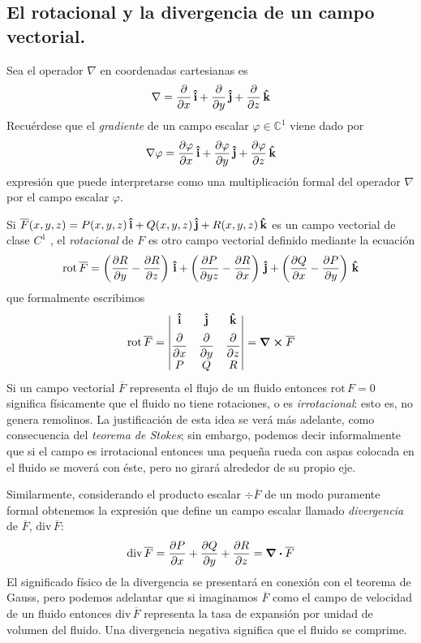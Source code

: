 \documentclass[hidelinks,12pt]{article}
\begin{document}
\subsection{El rotacional y la divergencia de un campo vectorial.}
Sea el operador $\nabla$ en coordenadas cartesianas es
\begin{align*}
\nabla = \pdv{x} \, \vu{i} + \pdv{y} \, \vu{j} + \pdv{z} \, \vu{k} 
\end{align*}
Recuérdese que el \emph{gradiente} de un campo escalar $\varphi \in \mathbb{C}^{1}$ viene dado por
\begin{align*}
\nabla \varphi = \pdv{\varphi}{x} \, \vu{i} + \pdv{\varphi}{y} \, \vu{j} + \pdv{\varphi}{z} \, \vu{k} 
\end{align*}
expresión que puede interpretarse como una multiplicación formal del operador $\nabla$ por el campo escalar $\varphi$.
\par
Si $\overline{F}(x, y, z) = P(x, y, z) \, \vu{i} + Q(x, y, z) \, \vu{j} + R(x, y, z) \, \vu{k}$ es un campo vectorial de clase $C^{1}$ , el \emph{rotacional} de $F$ es otro campo vectorial definido mediante la ecuación
\begin{align*}
\text{rot} \, \overline{F} =  \left( \pdv{R}{y} - \pdv{R}{z} \right) \, \vu{i} + \left( \pdv{P}{yz} - \pdv{R}{x} \right) \, \vu{j} + \left( \pdv{Q}{x} - \pdv{P}{y} \right) \, \vu{k}
\end{align*}
que formalmente escribimos
\begin{align*}
\text{rot} \, \overline{F} = \mdet{
\vu{i} & \vu{j} & \vu{k} \\[0.5em]
\displaystyle \pdv{x} & \displaystyle \pdv{y} & \displaystyle \pdv{z} \\[0.5em]
P & Q & R} = \curl{\overline{F}}
\end{align*}
Si un campo vectorial $\overline{F}$ representa el flujo de un fluido entonces $\text{rot} \, F = 0$ significa físicamente que el fluido no tiene rotaciones, o es \emph{irrotacional}: esto es, no genera remolinos. La justificación de esta idea se verá más adelante, como consecuencia del \emph{teorema de Stokes}; sin embargo, podemos decir informalmente que si el
campo es irrotacional entonces una pequeña rueda con aspas colocada en el fluido se moverá con éste, pero no
girará alrededor de su propio eje.
\par
Similarmente, considerando el producto escalar $\div{\overline{F}}$ de un modo puramente formal obtenemos la expresión que define un campo escalar llamado \emph{divergencia} de $\overline{F}$, $\text{div} \, \overline{F}$:
\begin{align*}
\text{div} \, \overline{F} = \pdv{P}{x} + \pdv{Q}{y} + \pdv{R}{z} = \div{\overline{F}}
\end{align*}
El significado físico de la divergencia se presentará en conexión con el teorema de Gauss, pero podemos adelantar que si imaginamos $\overline{F}$ como el campo de velocidad de un fluido entonces $\text{div} \, \overline{F}$ representa la tasa de expansión por unidad de volumen del fluido. Una divergencia negativa significa que el fluido se comprime.
\end{document}
